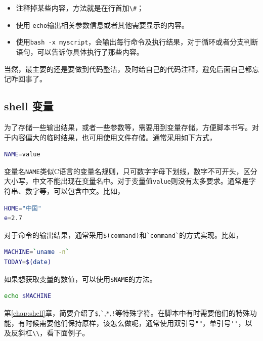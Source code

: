 \documentclass[doctor,openright,twoside]{sjtuthesis}
\providecommand{\tightlist}{%
    \setlength{\itemsep}{0pt}\setlength{\parskip}{0pt}}
\newcommand{\passthrough}[1]{#1}
\theoremstyle{plain}
\theoremstyle{definition}
\theoremstyle{remark}
\theoremstyle{ocrenumbox}
\theoremstyle{plain}
\begin{document}
\begin{itemize}
\tightlist
\item
  注释掉某些内容，方法就是在行首加\passthrough{\lstinline!\#!}；
\item
  使用 \passthrough{\lstinline!echo!}输出相关参数信息或者其他需要显示的内容。
\item
  使用\passthrough{\lstinline!bash -x myscript!}，会输出每行命令及执行结果，对于循环或者分支判断语句，可以告诉你具体执行了那些内容。
\end{itemize}

当然，最主要的还是要做到代码整洁，及时给自己的代码注释，避免后面自己都忘记咋回事了。

\hypertarget{shell--3}{%
\subsection{shell 变量}\label{shell--3}}

为了存储一些输出结果，或者一些参数等，需要用到变量存储，方便脚本书写。对于内容偏大的临时结果，也可用使用文件存储。通常采用如下方式，

\begin{lstlisting}[language=bash]
NAME=value
\end{lstlisting}

变量名\passthrough{\lstinline!NAME!}类似C语言的变量名规则，只可数字字母下划线，数字不可开头，区分大小写，中文不能出现在变量名中。对于变量值\passthrough{\lstinline!value!}则没有太多要求。通常是字符串、数字等，可以包含中文。比如，

\begin{lstlisting}[language=bash]
HOME="中国"
e=2.7
\end{lstlisting}

对于命令的输出结果，通常采用\passthrough{\lstinline!$(command)!}和\passthrough{\lstinline!`command`!}的方式实现。比如，

\begin{lstlisting}[language=bash]
MACHINE=`uname -n`
TODAY=$(date)
\end{lstlisting}

如果想获取变量的数值，可以使用\passthrough{\lstinline!$NAME!}的方法。

\begin{lstlisting}[language=bash]
echo $MACHINE
\end{lstlisting}

第\ref{chap:shell}章，简要介绍了\passthrough{\lstinline!$!},\passthrough{\lstinline!`!},\passthrough{\lstinline!*!},\passthrough{\lstinline"!"}等特殊字符。在脚本中有时需要他们的特殊功能，有时候需要他们保持原样，该怎么做呢，通常使用双引号\passthrough{\lstinline!""!}，单引号\passthrough{\lstinline!''!}，以及反斜杠\passthrough{\lstinline!\\!}，看下面例子。
\end{document}

